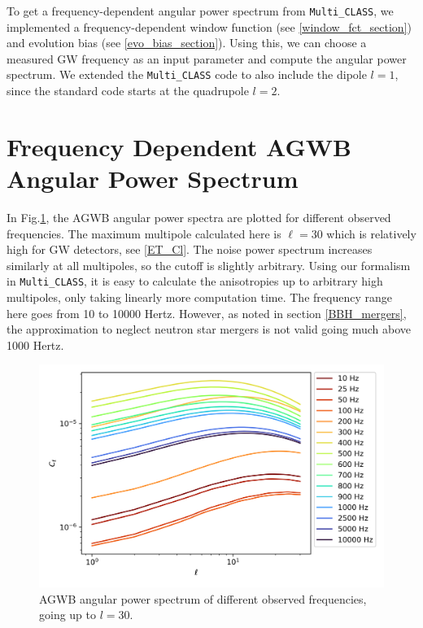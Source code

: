 To get a frequency-dependent angular power spectrum from {\tt Multi\_CLASS}, we implemented a frequency-dependent window function (see \ref{window_fct_section}) and evolution bias (see \ref{evo_bias_section}). Using this, we can choose a measured GW frequency as an input parameter and compute the angular power spectrum. We extended the {\tt Multi\_CLASS} code to also include the dipole $l=1$, since the standard code starts at the quadrupole $l=2$. 

\section{Frequency Dependent AGWB Angular Power Spectrum}

In Fig.\ref{AGWB_anisotropies}, the AGWB angular power spectra are plotted for different observed frequencies. The maximum multipole calculated here is $\ell=30$ which is relatively high for GW detectors, see \ref{ET_Cl}. The noise power spectrum increases similarly at all multipoles, so the cutoff is slightly arbitrary. Using our formalism in {\tt Multi\_CLASS}, it is easy to calculate the anisotropies up to arbitrary high multipoles, only taking linearly more computation time. The frequency range here goes from 10 to 10000 Hertz. However, as noted in section \ref{BBH_mergers}, the approximation to neglect neutron star mergers is not valid going much above 1000 Hertz.

\begin{figure}
    \centering
    \includegraphics[width=1\linewidth]{Images/C_l_frequencies.png}
    \caption{AGWB angular power spectrum of different observed frequencies, going up to $l=30$.}
    \label{AGWB_anisotropies}
\end{figure} 

